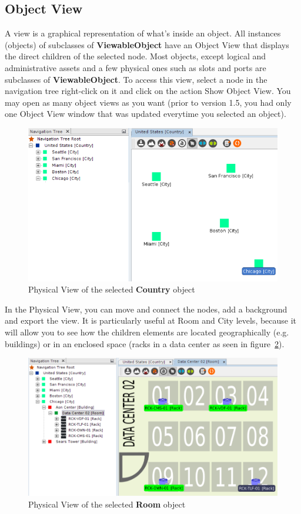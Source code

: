 \documentclass[a4paper]{article}
\begin{document}
	\subsection{Object View} \label{sec:default_view}
		A view is a graphical representation of what's inside an object. All instances (objects) of subclasses of \textbf{ViewableObject} have an Object View that displays the direct children of the selected node. Most objects, except logical and administrative assets and a few physical ones such as slots and ports are subclasses of \textbf{ViewableObject}. To access this view, select a node in the navigation tree right-click on it and click on the action Show Object View. You may open as many object views as you want (prior to version 1.5, you had only one Object View window that was updated everytime you selected an object).
		\begin{figure}[h!]
			\centering
			\includegraphics[width=0.9\linewidth]{img/default_view.png}
			\caption{Physical View of the selected \textbf{Country} object}
			\label{fig:default_view}
		\end{figure}
		
		In the Physical View, you can move and connect the nodes, add a background and export the view. It is particularly useful at Room and City levels, because it will allow you to see how the children elements are located geographically (e.g. buildings) or in an enclosed space (racks in a data center as seen in figure~\ref{fig:room_plan}).	
		\begin{figure}[h!]
			\centering
			\includegraphics[width=0.8\linewidth]{img/room_plan.png}
			\caption{Physical View of the selected \textbf{Room} object}
			\label{fig:room_plan}
		\end{figure}
		
\end{document}
